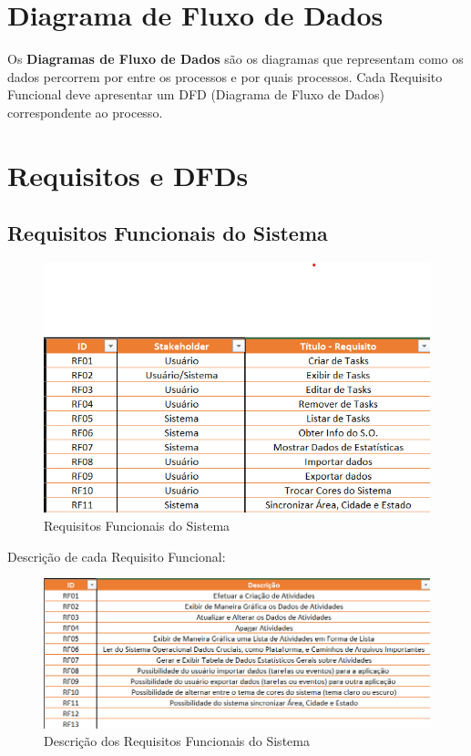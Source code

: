 \documentclass[a4paper,12pt]{article}
\begin{document}
\section{Diagrama de Fluxo de Dados}
Os \textbf{Diagramas de Fluxo de Dados} são os diagramas que representam como os dados percorrem por entre os processos e por quais processos. Cada Requisito Funcional deve apresentar um DFD (Diagrama de Fluxo de Dados) correspondente ao processo.

\section{Requisitos e DFDs}
\subsection{Requisitos Funcionais do Sistema}
\begin{figure}[H]
	\centering
	\includegraphics[scale=0.80]{requirements/functionals/requirements.png}
	\caption{Requisitos Funcionais do Sistema}
\end{figure}
Descrição de cada Requisito Funcional:
\begin{figure}[H]
	\centering
	\includegraphics[scale=0.80]{requirements/functionals/description.png}
	\caption{Descrição dos Requisitos Funcionais do Sistema}
\end{figure}
\end{document}

